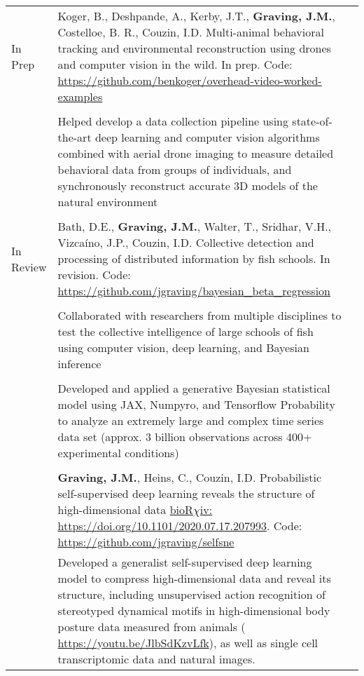 \documentclass[letterpaper,10pt,oneside]{article}
\newcommand{\tabitem}{\hspace{2mm}\textbullet\hspace{2mm}}
\begin{document}
\begin{small}
\begin{longtable}{@{} l p{5in}l}
\large{In Prep}
& Koger, B., Deshpande, A., Kerby, J.T., \textbf{Graving, J.M.}, Costelloe, B. R.,  Couzin, I.D. Multi-animal behavioral tracking and environmental reconstruction using drones and computer vision in the wild. In prep. Code: \href{https://github.com/benkoger/overhead-video-worked-examples}{ https://github.com/benkoger/overhead-video-worked-examples}  \\
& \\
& \tabitem Helped develop a data collection pipeline using state-of-the-art deep learning and computer vision algorithms combined with aerial drone imaging to measure detailed behavioral data from groups of individuals, and synchronously reconstruct accurate 3D models of the natural environment \\
& \\
\large{In Review}
& Bath, D.E., \textbf{Graving, J.M.}, Walter, T., Sridhar, V.H.,  Vizcaíno, J.P., Couzin, I.D. Collective detection and processing of distributed information by fish schools. In revision.  Code: \href{https://github.com/jgraving/bayesian\_beta\_regression/blob/main/bath\_bayesian\_beta\_regression\_numpyro.ipynb}{https://github.com/jgraving/bayesian\_beta\_regression} \\
& \\
& \tabitem Collaborated with researchers from multiple disciplines to test the collective intelligence of large schools of fish using computer vision, deep learning, and Bayesian inference \\
& \\
& \tabitem Developed and applied a generative Bayesian statistical model using JAX, Numpyro, and Tensorflow Probability to analyze an extremely large and complex time series data set (approx. 3 billion observations across 400+ experimental conditions) \\
& \\
& \textbf{Graving, J.M.}, Heins, C., Couzin, I.D. Probabilistic self-supervised deep learning reveals the structure of high-dimensional data \href{https://doi.org/10.1101/2020.07.17.207993}{bioR$\chi$iv: https://doi.org/10.1101/2020.07.17.207993}. Code: \href{https://github.com/jgraving/selfsne}{ https://github.com/jgraving/selfsne} \vspace{2mm} \\
& 	\tabitem Developed a generalist self-supervised deep learning model to compress high-dimensional data and reveal its structure, including unsupervised action recognition of stereotyped dynamical motifs in high-dimensional body posture data measured from animals ( \href{https://youtu.be/JlbSdKzvLfk}{https://youtu.be/JlbSdKzvLfk}), as well as single cell transcriptomic data and natural images. \vspace{2mm}\\

\end{longtable}
\end{small}
\end{document}
